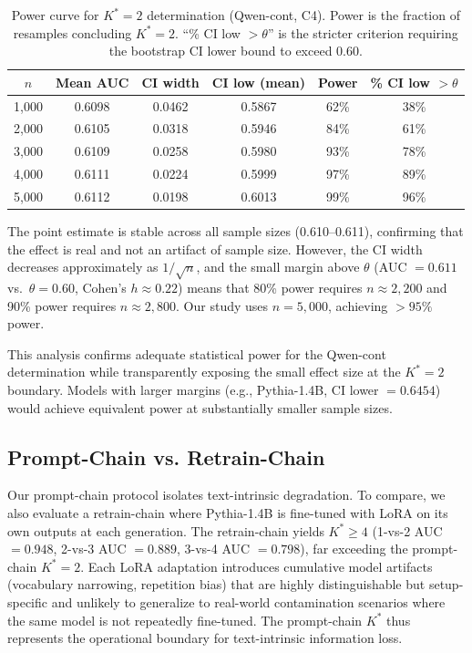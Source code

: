 \documentclass[11pt,a4paper]{article}
\newcommand{\Kstar}{K^{*}}
\begin{document}
\begin{table}[t]
\centering
\caption{Power curve for $\Kstar = 2$ determination (Qwen-cont, C4). Power is the fraction of resamples concluding $\Kstar = 2$. ``\% CI low $> \theta$'' is the stricter criterion requiring the bootstrap CI lower bound to exceed 0.60.}
\label{tab:power}
\small
\begin{tabular}{cccccc}
\toprule
$n$ & \textbf{Mean AUC} & \textbf{CI width} & \textbf{CI low (mean)} & \textbf{Power} & \textbf{\% CI low $> \theta$} \\
\midrule
1,000 & 0.6098 & 0.0462 & 0.5867 & 62\% & 38\% \\
2,000 & 0.6105 & 0.0318 & 0.5946 & 84\% & 61\% \\
3,000 & 0.6109 & 0.0258 & 0.5980 & 93\% & 78\% \\
4,000 & 0.6111 & 0.0224 & 0.5999 & 97\% & 89\% \\
5,000 & 0.6112 & 0.0198 & 0.6013 & 99\% & 96\% \\
\bottomrule
\end{tabular}
\end{table}

The point estimate is stable across all sample sizes (0.610--0.611), confirming that the effect is real and not an artifact of sample size. However, the CI width decreases approximately as $1/\sqrt{n}$, and the small margin above $\theta$ (AUC $= 0.611$ vs.\ $\theta = 0.60$, Cohen's $h \approx 0.22$) means that 80\% power requires $n \approx 2{,}200$ and 90\% power requires $n \approx 2{,}800$. Our study uses $n = 5{,}000$, achieving $> 95\%$ power.

This analysis confirms adequate statistical power for the Qwen-cont determination while transparently exposing the small effect size at the $\Kstar = 2$ boundary. Models with larger margins (e.g., Pythia-1.4B, CI lower $= 0.6454$) would achieve equivalent power at substantially smaller sample sizes.

\subsection{Prompt-Chain vs. Retrain-Chain}
\label{sec:retrain}

Our prompt-chain protocol isolates text-intrinsic degradation. To compare, we also evaluate a retrain-chain where Pythia-1.4B is fine-tuned with LoRA on its own outputs at each generation. The retrain-chain yields $\Kstar \geq 4$ (1-vs-2 AUC $= 0.948$, 2-vs-3 AUC $= 0.889$, 3-vs-4 AUC $= 0.798$), far exceeding the prompt-chain $\Kstar = 2$. Each LoRA adaptation introduces cumulative model artifacts (vocabulary narrowing, repetition bias) that are highly distinguishable but setup-specific and unlikely to generalize to real-world contamination scenarios where the same model is not repeatedly fine-tuned. The prompt-chain $\Kstar$ thus represents the operational boundary for text-intrinsic information loss.
\end{document}
